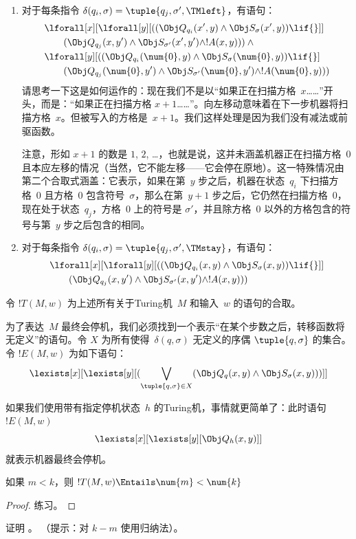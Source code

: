 \documentclass[../../../include/open-logic-section]{subfiles}
\begin{document}
\begin{enumerate}
\begin{enumerate}
\item {} 对于每条指令 $\delta(q_i, \sigma) =
  \tuple{q_j, \sigma', \TMleft}$，有语句：
\begin{align*}
& \lforall[x][\lforall[y][
    ((\Obj Q_{q_i}(x', y) \land \Obj S_{\sigma}(x', y)) \lif {}]]\\
& \qquad   (\Obj Q_{q_j}(x, y') \land \Obj S_{\sigma'}(x', y') \land
!A(x, y))) \land {}\\
& \lforall[y][((\Obj Q_{q_i}(\num{0}, y) \land \Obj S_{\sigma}(\num{0},
    y)) \lif {}]\\
& \qquad (\Obj Q_{q_j}(\num{0}, y') \land \Obj S_{\sigma'}(\num{0},
  y') \land !A(\num{0}, y)))
\end{align*}
请思考一下这是如何运作的：现在我们不是以“如果正在扫描方格~$x$……”开头，而是：“如果正在扫描方格 $x+1$……”。向左移动意味着在下一步机器将扫描方格~$x$。但被写入的方格是~$x+1$。我们这样处理是因为我们没有减法或前驱函数。

注意，形如 $x+1$ 的数是 $1$, $2$, \dots，也就是说，这并未涵盖机器正在扫描方格~$0$ 且本应左移的情况（当然，它不能左移——它会停在原地）。这一特殊情况由第二个合取式涵盖：它表示，如果在第~$y$ 步之后，机器在状态~$q_i$ 下扫描方格~$0$ 且方格~$0$ 包含符号~$\sigma$，那么在第~$y+1$ 步之后，它仍然在扫描方格~$0$，现在处于状态~$q_j$，方格~$0$ 上的符号是 $\sigma'$，并且除方格~$0$ 以外的方格包含的符号与第~$y$ 步之后包含的相同。
\item {} 对于每条指令 $\delta(q_i, \sigma) =
  \tuple{q_j, \sigma', \TMstay}$，有语句：
\begin{align*}
& \lforall[x][\lforall[y][(
   (\Obj Q_{q_i}(x, y) \land \Obj S_{\sigma}(x, y)) \lif {}]] \\
&\qquad   (\Obj Q_{q_j}(x, y') \land \Obj S_{\sigma'}(x, y') \land
!A(x, y)))
\end{align*}
\end{enumerate}
\end{enumerate}

令 $!T(M, w)$ 为上述所有关于Turing机~$M$ 和输入~$w$ 的语句的合取。

为了表达~$M$ 最终会停机，我们必须找到一个表示“在某个步数之后，转移函数将无定义”的语句。令 $X$ 为所有使得~$\delta(q, \sigma)$ 无定义的序偶 $\tuple{q, \sigma}$ 的集合。令 $!E(M, w)$ 为如下语句：
\[
\lexists[x][\lexists[y][(\bigvee_{\tuple{q, \sigma} \in
      X}(\Obj Q_q(x, y) \land \Obj S_\sigma(x, y)))]]
\]

如果我们使用带有指定停机状态~$h$ 的Turing机，事情就更简单了：此时语句~$!E(M, w)$
\[
\lexists[x][\lexists[y][\Obj Q_h(x, y)]]
\]
就表示机器最终会停机。

\begin{prop}
如果 $m < k$，则 $!T(M, w) \Entails \num{m} < \num{k}$
\end{prop}

\begin{proof}
练习。
\end{proof}

\begin{prob}
证明 。
（提示：对 $k-m$ 使用归纳法）。
\end{prob}
\end{document}
